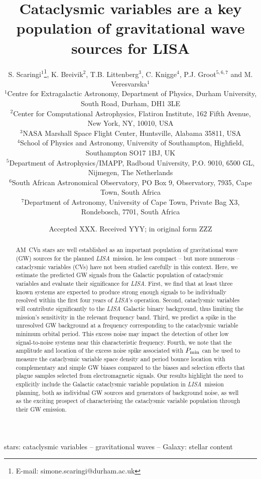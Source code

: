 \documentclass[fleqn,usenatbib]{mnras}
\title[LISA CVs]{Cataclysmic variables are a key population of gravitational wave sources for LISA}
\author[S. Scaringi et al.]{
S. Scaringi$^{1}$\thanks{E-mail: simone.scaringi@durham.ac.uk},
K. Breivik$^{2}$,
T.B. Littenberg$^{3}$,
C. Knigge$^{4}$,
P.J. Groot$^{5,6,7}$ and
M. Veresvarska$^{1}$
\\
$^{1}$Centre for Extragalactic Astronomy, Department of Physics, Durham University, South Road, Durham, DH1 3LE\\
$^{2}$Center for Computational Astrophysics, Flatiron Institute, 162 Fifth Avenue, New York, NY, 10010, USA\\
$^{3}$NASA Marshall Space Flight Center, Huntsville, Alabama 35811, USA\\
$^{4}$School of Physics and Astronomy, University of Southampton, Highfield, Southampton SO17 1BJ, UK\\
$^{5}$Department of Astrophysics/IMAPP, Radboud University, P.O. 9010, 6500 GL, Nijmegen, The Netherlands\\
$^{6}$South African Astronomical Observatory, PO Box 9, Observatory, 7935, Cape Town, South Africa\\
$^{7}$Department of Astronomy, University of Cape Town, Private Bag X3, Rondebosch, 7701, South Africa\\
}
\date{Accepted XXX. Received YYY; in original form ZZZ}
\newcommand{\lisa}{{\it LISA}}
\begin{document}
\maketitle

\begin{abstract}

    AM~CVn stars are well established as an important population of gravitational wave (GW) sources for the planned \lisa\ mission. he less compact – but more numerous – cataclysmic variables (CVs) have not been studied carefully in this context. Here, we estimate the predicted GW signals from the Galactic population of cataclysmic variables and evaluate their significance for \lisa. First, we find that at least three known systems are expected to produce strong enough signals to be individually resolved within the first four years of \lisa's operation. Second, cataclysmic variables will contribute significantly to the \lisa\ Galactic binary background, thus limiting the mission's sensitivity in the relevant frequency band. Third, we predict a spike in the unresolved GW background at a frequency corresponding to the cataclysmic variable minimum orbital period. This excess noise may impact the detection of other low signal-to-noise systems near this characteristic frequency. Fourth, we note that the amplitude and location of the excess noise spike associated with $P_{\rm{min}}$ can be used to measure the cataclysmic variable space density and period bounce location with complementary and simple GW biases compared to the biases and selection effects that plague samples selected from electromagnetic signals. Our results highlight the need to explicitly include the Galactic cataclysmic variable population in \lisa\ mission planning, both as individual GW sources and generators of background noise, as well as the exciting prospect of characterising the cataclysmic variable population through their GW emission.
\end{abstract}
    
    
\begin{keywords}
    stars: cataclysmic variables -- gravitational waves -- Galaxy: stellar content 
\end{keywords}

\end{document}
